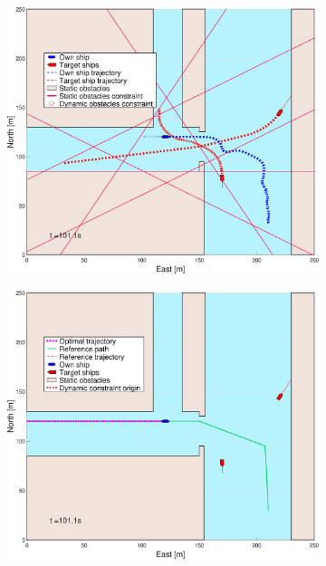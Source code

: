 \begin{figure}[ht]
\begin{subfigure}[b]{0.494\textwidth}
        \subcaption{}
    \end{subfigure}
    \hfill
    \\
    \begin{subfigure}[b]{0.494\textwidth}
        \centering
        \includegraphics[width=\textwidth]{Images/Figures/Havn1/_Simple_0fig1_time=101}
        \subcaption{}
    \end{subfigure}
    \hfill
    \begin{subfigure}[b]{0.494\textwidth}
        \centering
        \includegraphics[width=\textwidth]{Images/Figures/Havn1/_Simple_0fig999_time=101}

\end{subfigure}
\end{figure}
